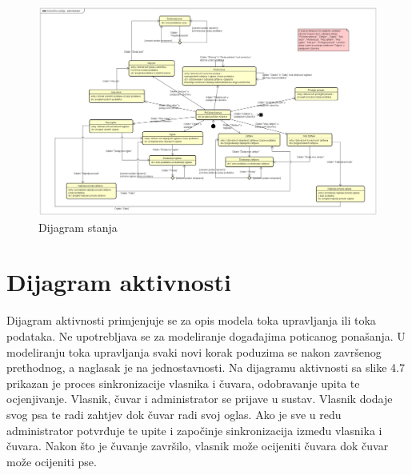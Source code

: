 			
			\begin{figure}[htb]
				\centering
				\includegraphics[width=15cm]{slike/Dijagram stanja}
				\caption{Dijagram stanja}
				\label{fig:State-Diagram}
			\end{figure}
			
			\eject 
		
		\section{Dijagram aktivnosti}
			
			Dijagram aktivnosti primjenjuje se za opis modela toka upravljanja ili toka podataka. Ne upotrebljava se za modeliranje događajima poticanog ponašanja. U
			modeliranju toka upravljanja svaki novi korak poduzima se nakon završenog prethodnog, a naglasak je na jednostavnosti. Na dijagramu aktivnosti sa slike 4.7 prikazan je proces sinkronizacije vlasnika i čuvara, odobravanje upita te ocjenjivanje. Vlasnik, čuvar i administrator se prijave u sustav. Vlasnik dodaje svog psa te radi zahtjev dok čuvar radi svoj oglas.
			Ako je sve u redu administrator potvrđuje te upite i započinje sinkronizacija između vlasnika i čuvara. Nakon što je čuvanje završilo, vlasnik može ocijeniti čuvara dok čuvar može ocijeniti pse.
			
			
			
